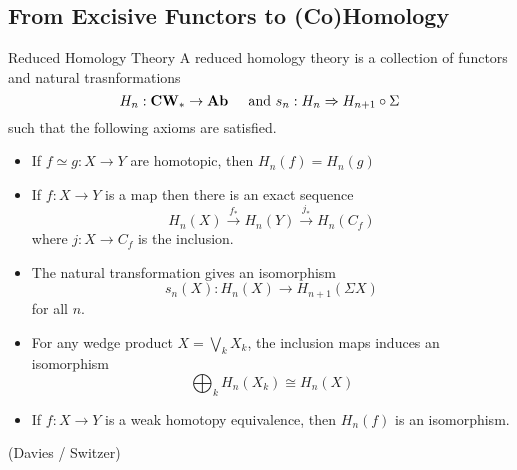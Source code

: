 \documentclass[a4paper]{article}
\begin{document}
\subsection{From Excisive Functors to (Co)Homology}
\begin{defn}{Reduced Homology Theory}{} A reduced homology theory is a collection of functors and natural trasnformations $$H_n:\bold{CW}_\ast\to\bold{Ab}\;\;\;\;\text{ and }s_n:H_n\Rightarrow H_{n+1}\circ\Sigma$$ such that the following axioms are satisfied. 
\begin{itemize}
\item If $f\simeq g:X\to Y$ are homotopic, then $H_n(f)=H_n(g)$
\item If $f:X\to Y$ is a map then there is an exact sequence $$H_n(X)\overset{f_\ast}{\rightarrow}H_n(Y)\overset{j_\ast}{\rightarrow}H_n(C_f)$$ where $j:X\to C_f$ is the inclusion. 
\item The natural transformation gives an isomorphism $$s_n(X):H_n(X)\to H_{n+1}(\Sigma X)$$ for all $n$. 
\item For any wedge product $X=\bigvee_k X_k$, the inclusion maps induces an isomorphism $$\bigoplus_k H_n(X_k)\cong H_n(X)$$
\item If $f:X\to Y$ is a weak homotopy equivalence, then $H_n(f)$ is an isomorphism. 
\end{itemize}
\end{defn} (Davies / Switzer)
\end{document}
